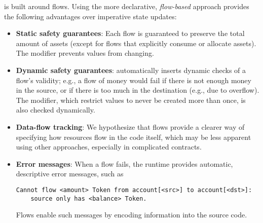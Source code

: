 \documentclass[dvipsnames,runningheads]{llncs}
\begin{document}
\langName is built around flows.
Using the more declarative, \emph{flow-based} approach provides the following advantages over imperative state updates:
\begin{itemize}
    \item \textbf{Static safety guarantees}: Each flow is guaranteed to preserve the total amount of assets (except for flows that explicitly consume or allocate assets). %
        The  modifier prevents values from changing.
    \item \textbf{Dynamic safety guarantees}: \langName automatically inserts dynamic checks of a flow's validity; e.g., a flow of money would fail if there is not enough money in the source, or if there is too much in the destination (e.g., due to overflow).
        The  modifier, which restrict values to never be created more than once, is also checked dynamically.
    \item \textbf{Data-flow tracking}: We hypothesize that flows provide a clearer way of specifying how resources flow in the code itself, which may be less apparent using other approaches, especially in complicated contracts.
    \item \textbf{Error messages}: When a flow fails, the \langName runtime provides automatic, descriptive error messages, such as
\begin{lstlisting}[numbers=none, basicstyle=\small\ttfamily, xleftmargin=-5.0ex]
Cannot flow <amount> Token from account[<src>] to account[<dst>]:
    source only has <balance> Token.
\end{lstlisting}
        Flows enable such messages by encoding information into the source code.
\end{itemize}
\end{document}
